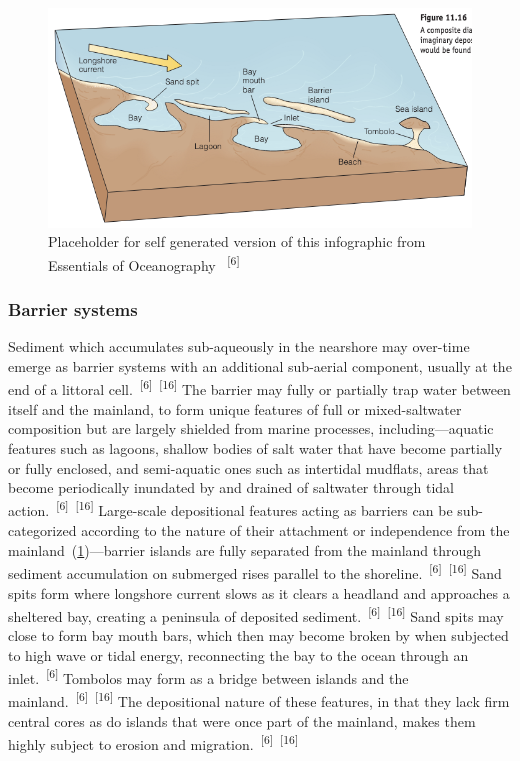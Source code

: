 \documentclass{article}
\begin{document}

\begin{figure}
    \centering
    \includegraphics[width=.9\linewidth]{images/depositional-morphology.png}
    \caption{Placeholder for self generated version of this infographic from Essentials of Oceanography ~\textsuperscript{[6]}}
    \label{figure10}
\end{figure}

\subsubsection{Barrier systems}


\par{Sediment which accumulates sub-aqueously in the nearshore may over-time emerge as barrier systems with an additional sub-aerial component, usually at the end of a littoral cell.~\textsuperscript{[6]}~\textsuperscript{[16]} The barrier may fully or partially trap water between itself and the mainland, to form unique features of full or mixed-saltwater composition but are largely shielded from marine processes, including---aquatic features such as lagoons, shallow bodies of salt water that have become partially or fully enclosed, and semi-aquatic ones such as intertidal mudflats, areas that become periodically inundated by and drained of saltwater through tidal action.~\textsuperscript{[6]}~\textsuperscript{[16]} Large-scale depositional features acting as barriers can be sub-categorized according to the nature of their attachment or independence from the mainland~(\cref{figure10})---barrier islands are fully separated from the mainland through sediment accumulation on submerged rises parallel to the shoreline.~\textsuperscript{[6]}~\textsuperscript{[16]} Sand spits form where longshore current slows as it clears a headland and approaches a sheltered bay, creating a peninsula of deposited sediment.~\textsuperscript{[6]}~\textsuperscript{[16]} Sand spits may close to form bay mouth bars, which then may become broken by when subjected to high wave or tidal energy, reconnecting the bay to the ocean through an inlet.~\textsuperscript{[6]} Tombolos may form as a bridge between islands and the mainland.~\textsuperscript{[6]}~\textsuperscript{[16]} The depositional nature of these features, in that they lack firm central cores as do islands that were once part of the mainland, makes them highly subject to erosion and migration.~\textsuperscript{[6]}~\textsuperscript{[16]}} 
\end{document}
